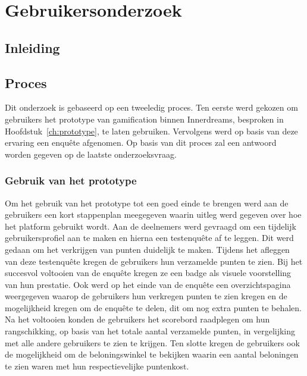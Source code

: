 
\chapter{Gebruikersonderzoek}
\label{ch:gebruikersonderzoek}

\section{Inleiding}

\section{Proces}

Dit onderzoek is gebaseerd op een tweeledig proces. Ten eerste werd gekozen om gebruikers het prototype van gamification binnen Innerdreams, besproken in Hoofdstuk~\ref{ch:prototype}, te laten gebruiken. Vervolgens werd op basis van deze ervaring een enquête afgenomen. Op basis van dit proces zal een antwoord worden gegeven op de laatste onderzoeksvraag.

\subsection{Gebruik van het prototype}

Om het gebruik van het prototype tot een goed einde te brengen werd aan de gebruikers een kort stappenplan meegegeven waarin uitleg werd gegeven over hoe het platform gebruikt wordt. Aan de deelnemers werd gevraagd om een tijdelijk gebruikersprofiel aan te maken en hierna een testenquête af te leggen. Dit werd gedaan om het verkrijgen van punten duidelijk te maken. Tijdens het afleggen van deze testenquête kregen de gebruikers hun verzamelde punten te zien. Bij het succesvol voltooien van de enquête kregen ze een badge als visuele voorstelling van hun prestatie. Ook werd op het einde van de enquête een overzichtspagina weergegeven waarop de gebruikers hun verkregen punten te zien kregen en de mogelijkheid kregen om de enquête te delen, dit om nog extra punten te behalen. Na het voltooien konden de gebruikers het scorebord raadplegen om hun rangschikking, op basis van het totale aantal verzamelde punten, in vergelijking met alle andere gebruikers te zien te krijgen. Ten slotte kregen de gebruikers ook de mogelijkheid om de beloningswinkel te bekijken waarin een aantal beloningen te zien waren met hun respectievelijke puntenkost.

